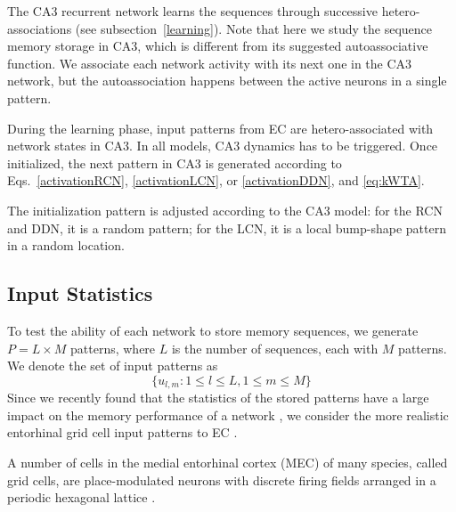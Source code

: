 \documentclass[utf8]{frontiersSCNS} %
\begin{document}
\begin{enumerate}
The CA3 recurrent network learns the sequences through successive hetero-associations (see subsection~\ref{learning}).
%
Note that here we study the sequence memory storage in CA3, which is different from its suggested autoassociative function. We associate each network activity with its next one in the CA3 network, but the autoassociation happens between the active neurons in a single pattern.
\end{enumerate}

During the learning phase, input patterns from EC are hetero-associated with network states in CA3. In all models, CA3 dynamics has to be triggered. Once initialized, the next pattern in CA3 is generated according to Eqs.~\ref{activationRCN}, \ref{activationLCN}, or \ref{activationDDN}, and \ref{eq:kWTA}.

The initialization pattern is adjusted according to the CA3 model: for the RCN and DDN, it is a random pattern; for the LCN, it is a local bump-shape pattern in a random location.


\subsection{Input Statistics}

To test the ability of each network to store memory sequences, we generate $P = L \times M$ patterns, where $L$ is the number of sequences, each with $M$ patterns. We denote the set of input patterns as 
\begin{equation}
	\{ u_{l,m}: 1\le l \le L, 1\le m \le M \}
\end{equation}
Since we recently found that the statistics of the stored patterns have a large impact on the memory performance of a network \cite{neher2015memory}, we consider the more realistic entorhinal grid cell input patterns to EC \cite{hafting2005microstructure}. 





A number of cells in the medial entorhinal cortex (MEC) of many species, called grid cells, are place-modulated neurons with discrete firing fields arranged in a periodic hexagonal lattice \cite{hafting2005microstructure}.  
\end{document}
